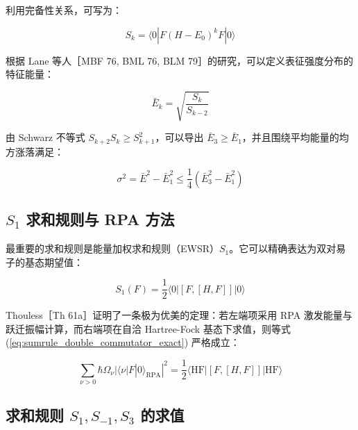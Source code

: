 利用完备性关系，可写为：

\begin{equation}
S_{k}=\langle0|F(H-E_{0})^{k}F|0\rangle\label{eq:sumrule_operator_moment}
\end{equation}

根据 Lane 等人［MBF 76, BML 76, BLM 79］的研究，可以定义表征强度分布的特征能量：

\begin{equation}
\bar{E}_{k}=\sqrt{\frac{S_{k}}{S_{k-2}}}\label{eq:sumrule_average_energy_def}
\end{equation}

由 Schwarz 不等式 $S_{k+2}S_{k}\ge S^{2}_{k+1}$，可以导出 $\bar{E}_{3}\ge\bar{E}_{1}$，并且围绕平均能量的均方涨落满足：

\begin{equation}
\sigma^{2}=\bar{E}^{2}-\bar{E}^{2}_{1}\le\frac{1}{4}\left(\bar{E}^{2}_{3}-\bar{E}^{2}_{1}\right)\label{eq:sumrule_energy_dispersion_bound}
\end{equation}


\subsection{$S_{1}$ 求和规则与 RPA 方法\label{subsec:8.7.2_S1=006C42=00548C=0089C4=005219=004E0ERPA=0065B9=006CD5}}

最重要的求和规则是能量加权求和规则（EWSR）$S_{1}$。它可以精确表达为双对易子的基态期望值：

\begin{equation}
S_{1}(F)=\frac{1}{2}\langle0|[F,[H,F]]|0\rangle\label{eq:sumrule_double_commutator_exact}
\end{equation}

Thouless［Th 61a］证明了一条极为优美的定理：若左端项采用 RPA 激发能量与跃迁振幅计算，而右端项在自洽 Hartree-Fock
基态下求值，则等式 (\ref{eq:sumrule_double_commutator_exact}) 严格成立：

\begin{equation}
\sum_{\nu>0}\hbar\Omega_{\nu}|\langle\nu|F|0\rangle_{\text{RPA}}|^{2}=\frac{1}{2}\langle\text{HF}|[F,[H,F]]|\text{HF}\rangle\label{eq:sumrule_thouless_theorem_rpa}
\end{equation}


\subsection{求和规则 $S_{1},S_{-1},S_{3}$ 的求值\label{subsec:8.7.3_=006C42=00548C=0089C4=005219=007684=006C42=00503C}}


